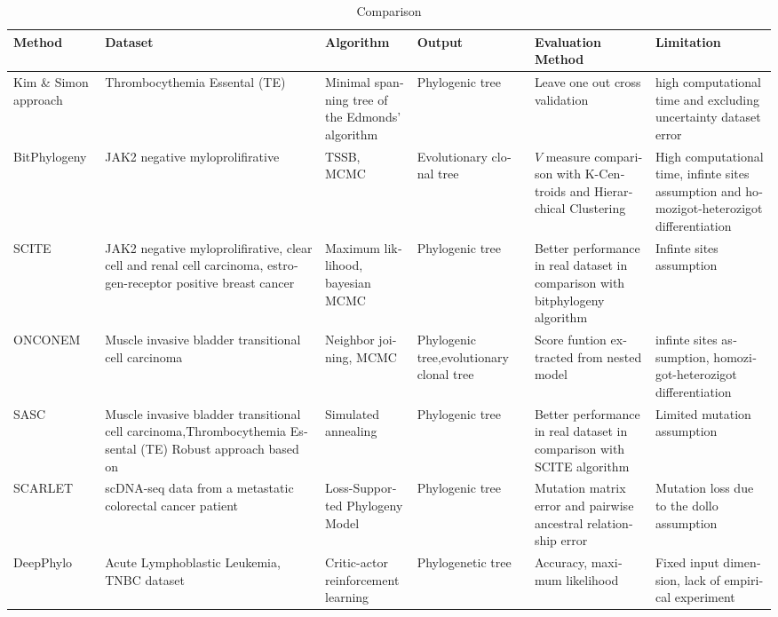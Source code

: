 \begin{sidewaystable}
	\caption{Comparison}
	\begin{latin}
		\centering
	    \tiny
		\begin{tabular}{|p{0.1\textheight}|p{0.14\textheight}|p{0.1\textheight}|p{0.1\textheight}|p{0.14\textheight}|p{0.14\textheight}|}
			\hline
			\rowcolor[gray]{0.9}
			Method & Dataset & Algorithm & Output & Evaluation Method & Limitation \\\hline
			Kim \& Simon approach &
			Thrombocythemia Essental (TE) &			
			Minimal spanning tree of the Edmonds’ algorithm &		
			Phylogenic tree &	
			Leave one out cross validation &
			high computational time and excluding uncertainty dataset error \\\hline
			BitPhylogeny &
			JAK2 negative myloprolifirative &
			TSSB, MCMC &
			Evolutionary clonal tree &
			$V$ measure comparison with K-Centroids  and Hierarchical Clustering &
			High computational time, infinte sites assumption and homozigot-heterozigot differentiation \\\hline
			SCITE &
			JAK2 negative myloprolifirative, clear cell and  renal cell carcinoma, estrogen-receptor positive breast cancer  &
			Maximum liklihood, bayesian MCMC &
			Phylogenic tree &
			Better performance in real dataset in comparison with bitphylogeny algorithm &
			Infinte sites assumption \\\hline
			ONCONEM &
			Muscle invasive bladder transitional cell carcinoma &
			Neighbor joining, MCMC &
			Phylogenic tree,evolutionary clonal tree &
			Score funtion extracted from nested model &
			infinte sites assumption, homozigot-heterozigot differentiation \\\hline
			SASC &
			Muscle invasive bladder transitional cell carcinoma,Thrombocythemia Essental (TE)  
			Robust approach based on &
			Simulated annealing &
			Phylogenic tree &
			Better performance in real dataset in comparison with SCITE algorithm &
			Limited mutation assumption \\\hline
			SCARLET &
			scDNA-seq data from a metastatic colorectal cancer patient &
			Loss-Supported Phylogeny Model &
			Phylogenic tree &
			Mutation matrix error and pairwise ancestral relationship error &
			Mutation loss due to the dollo assumption \\\hline
			DeepPhylo &
			Acute Lymphoblastic Leukemia, TNBC dataset &
			Critic-actor reinforcement learning &
			Phylogenetic tree &
			Accuracy, maximum likelihood &
			Fixed input dimension, lack of empirical experiment \\\hline
		\end{tabular}
	\end{latin}
	\label{tab:ch_rw:comp_methods}
\end{sidewaystable}
